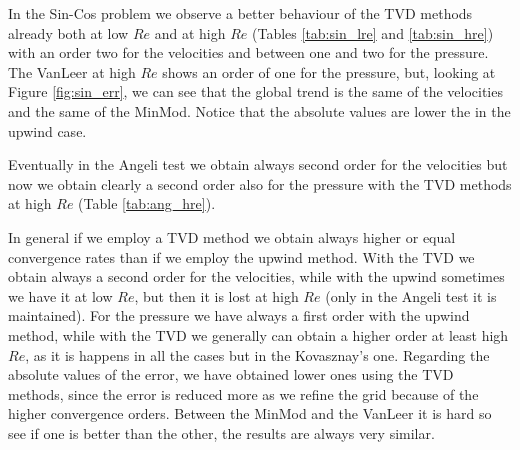\documentclass[11pt, a4paper]{article}
\theoremstyle{definition}
\begin{document}
In the Sin-Cos problem we observe a better behaviour of the TVD methods 
already both at low $Re$ and at high $Re$ (Tables \ref{tab:sin_lre} and 
\ref{tab:sin_hre}) with an order two for the 
velocities and between one and two for the pressure. The VanLeer at high $Re$ 
shows an order of one for the pressure, but, looking at Figure 
\ref{fig:sin_err}, we can see that the global trend is the same of the 
velocities and the same of the MinMod. Notice that the absolute values are 
lower the in the upwind case.

Eventually in the Angeli test we obtain always second order for the velocities 
but now we obtain clearly a second order also for the pressure with the TVD 
methods at high $Re$ (Table \ref{tab:ang_hre}).

In general if we employ a TVD method we obtain always higher or equal 
convergence rates than if we employ the upwind method. With the TVD we obtain 
always a second order for the velocities, while with the upwind sometimes we 
have it at low $Re$, but then it is lost at high $Re$ (only in the Angeli test 
it is maintained). For the pressure we have always a first order with the 
upwind method, while with the TVD we generally can obtain a higher order at 
least high $Re$, as it is happens in all the cases but in the Kovasznay's one.
Regarding the absolute values of the error, we have obtained lower ones using 
the TVD methods, since the error is reduced more as we refine the grid because 
of the higher convergence orders. Between the MinMod and the VanLeer it is hard 
so see if one is better than the other, the results are always very similar.
\end{document}
